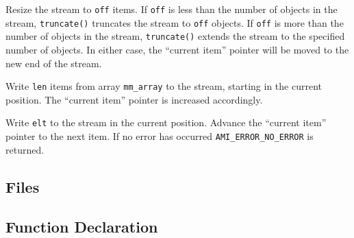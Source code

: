       {Resize the stream to
      \lstinline|off| items. If \lstinline|off| is less than the
      number of objects in the stream, \lstinline|truncate()|
      truncates the stream to \lstinline|off| objects. If
      \lstinline|off| is more than the number of objects in the
      stream, \lstinline|truncate()| extends the stream to the
      specified number of objects. In either case, the ``current
      item'' pointer will be moved to the new end of the stream.}
    
      {Write
      \lstinline|len| items from array \lstinline|mm_array| to the
      stream, starting in the current position. The ``current item''
      pointer is increased accordingly.}  
    
      {Write \lstinline|elt| to
      the stream in the current position. Advance the ``current item''
      pointer to the next item. If no error has occurred
      \lstinline|AMI_ERROR_NO_ERROR| is
      returned.} 
  
  \etabb
{}


\clearpage
        
        

\subsection{Files}
  \btabb
     {}
  \etabb

\subsection{Function Declaration}
\btabb {} {} \etabb

